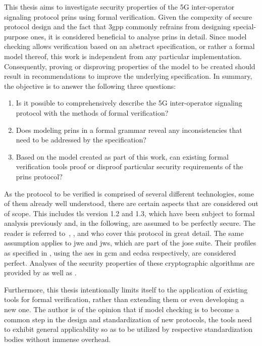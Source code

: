 This thesis aims to investigate security properties of the 5G inter-operator signaling protocol \gls{prins} using formal verification.
Given the compexity of secure protocol design and the fact that \gls{3gpp} commonly refrains from designing special-purpose ones, it is considered beneficial to analyse \gls{prins} in detail.
Since model checking allows verification based on an abstract specification, or rather a formal model thereof, this work is independent from any particular implementation.
Consequently, proving or disproving properties of the model to be created should result in recommendations to improve the underlying specification.
In summary, the objective is to answer the following three questions:

\begin{enumerate}[label=(\arabic*)]
    \item Is it possible to comprehensively describe the 5G inter-operator signaling protocol with the methods of formal verification?

    \item Does modeling \gls{prins} in a formal grammar reveal any inconsistencies that need to be addressed by the specification?

    \item Based on the model created as part of this work, can existing formal verification tools proof or disproof particular security requirements of the \gls{prins} protocol?
\end{enumerate}

As the protocol to be verified is comprised of several different technologies, some of them already well understood, there are certain aspects that are considered out of scope.
This includes \gls{tls} version 1.2 and 1.3, which have been subject to formal analysis previously and, in the following, are assumed to be perfectly secure.
The reader is referred to~\cite{horvat2015formal}, \cite{cremers2017comprehensive}, and \cite{van2018analysis} who cover this protocol in great detail.
The same assumption applies to \gls{jwe} and \gls{jws}, which are part of the \gls{jose} suite.
Their profiles as specified in \cite{3gpp.33.210}, using the \gls{aes} in \gls{gcm} and \gls{ecdsa} respectively, are considered perfect.
Analyses of the security properties of these cryptographic algorithms are provided by \cite{mcgrew2004security} as well as \cite{fersch2016provable}.

Furthermore, this thesis intentionally limits itself to the application of existing tools for formal verification, rather than extending them or even developing a new one.
The author is of the opinion that if model checking is to become a common step in the design and standardization of new protocols, the tools need to exhibit general applicability so as to be utilized by respective standardization bodies without immense overhead.

